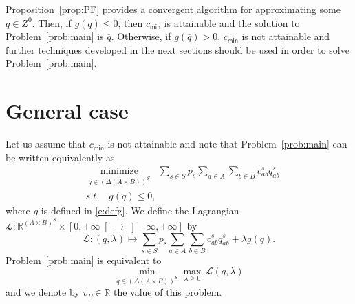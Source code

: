 \documentclass[smallextended,referee,envcountsect,]{svjour3}
\newcommand{\RP}{\ensuremath{\left[0,+\infty\right[}}
\newcommand{\RX}{\ensuremath{\left]-\infty,+\infty\right]}}
\newcommand{\R}{{\mathbb R}}
\newcommand{\minimize}[2]{\ensuremath{\underset{\substack{{#1}}}%
{\mathrm{minimize}}\;\;#2 }}
\begin{document}
Proposition~\ref{prop:PF} provides a convergent algorithm for 
approximating some $\overline{q}\in Z^0$. Then, if 
$g(\overline{q})\le 
0$, then 
$c_{\mathsf{min}}$ is attainable and the solution to 
Problem~\ref{prob:main} is $\overline{q}$.
Otherwise, if $g(\overline{q})> 0$,
$c_{\textsf{min}}$ is not attainable and further techniques 
developed 
{in the next sections} should be used in order to solve 
Problem~\ref{prob:main}. 


\section{General case}\label{sec:nonattainablecase}
Let us assume that $c_{\textsf{min}}$ is not attainable and
note that Problem~\ref{prob:main} can be written equivalently 
as
\begin{align}
\label{e:redprobmain} 
&\minimize{q \in (\Delta(A\times B))^S}
{\sum_{s\in S}p_s\sum_{a\in A}\sum_{b\in 
B}c_{ab}^sq_{ab}^s}\nonumber \\
&s.t.\quad g(q)\leq 0,
\end{align}
where $g$ is defined in \eqref{e:defg}.
We define the Lagrangian $\mathcal{L}\colon\R^{(A\times 
 B)^S}\times\RP\to \RX$ by
\begin{equation}
\label{e:defL}
\mathcal{L}\colon
(q,\lambda)\mapsto \sum_{s\in S}p_s\sum_{a\in A}\sum_{b\in 
B}c_{ab}^sq_{ab}^s 
+ \lambda g(q).
\end{equation}
Problem~\ref{prob:main} is equivalent to
\begin{equation}
\label{e:minmax}
\min_{q \in (\Delta(A\times B))^S}\max_{\lambda\ge 
0}\,\mathcal{L}(q,\lambda)
\end{equation}
{and we denote by $v_P\in\R$ the value of this problem.}
\end{document}
